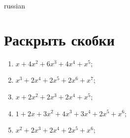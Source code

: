 \documentclass[20pt,a4paper]{article}
\begin{document}
\begin{otherlanguage*}{russian}

\section{Раскрыть скобки}\begin{enumerate}
\item $x + 4x^2 + 6x^3 + 4x^4 + x^5$;
\item $x^3 + 2x^4 + 2x^5 + 2x^6 + x^7$;
\item $x + 2x^2 + 2x^3 + 2x^4 + x^5$;
\item $1 + 2x + 3x^2 + 4x^3 + 3x^4 + 2x^5 + x^6$;
\item $x^2 + 2x^3 + 2x^4 + 2x^5 + x^6$;
\end{enumerate}
\end{otherlanguage*}
\end{document}
